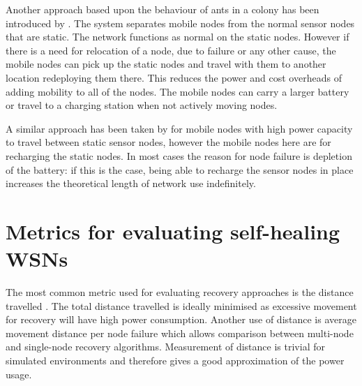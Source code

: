 \documentclass[authoryearcitations]{UoYCSproject}
\begin{document}
%

Another approach based upon the behaviour of ants in a colony has been introduced by \citet{Wang2014}. The system separates mobile nodes from the normal sensor nodes that are static. The network functions as normal on the static nodes. However if there is a need for relocation of a node, due to failure or any other cause, the mobile nodes can pick up the static nodes and travel with them to another location redeploying them there. This reduces the power and cost overheads of adding mobility to all of the nodes. The mobile nodes can carry a larger battery or travel to a charging station when not actively moving nodes.



A similar approach has been taken by \citet{Xu2015} for mobile nodes with high power capacity to travel between static sensor nodes, however the mobile nodes here are for recharging the static nodes. In most cases the reason for node failure is depletion of the battery: if this is the case, being able to recharge the sensor nodes in place increases the theoretical length of network use indefinitely.

\section{Metrics for evaluating self-healing WSNs}

The most common metric used for evaluating recovery approaches is the distance travelled \citep{Younis2014}. The total distance travelled is ideally minimised as excessive movement for recovery will have high power consumption. Another use of distance is average movement distance per node failure which allows comparison between multi-node and single-node recovery algorithms. Measurement of distance is trivial for simulated environments and therefore gives a good approximation of the power usage.
\end{document}
